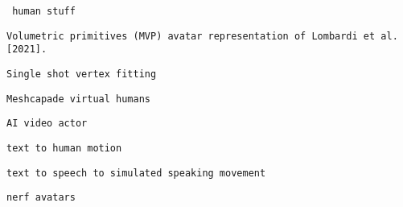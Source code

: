        
       
        \protect\hypertarget{ID_540648079}{}{}

\begin{verbatim}
 human stuff
\end{verbatim}

         
         
          \protect\hypertarget{ID_917082420}{}{}

\begin{verbatim}
Volumetric primitives (MVP) avatar representation of Lombardi et al. [2021].
\end{verbatim}
         

         
         
          \protect\hypertarget{ID_208977071}{}{}

\begin{verbatim}
Single shot vertex fitting
\end{verbatim}
         

         
         
          \protect\hypertarget{ID_1227330492}{}{}

\begin{verbatim}
Meshcapade virtual humans
\end{verbatim}
         

         
         
          \protect\hypertarget{ID_149878234}{}{}

\begin{verbatim}
AI video actor
\end{verbatim}
         

         
         
          \protect\hypertarget{ID_774594158}{}{}

\begin{verbatim}
text to human motion
\end{verbatim}
         

         
         
          \protect\hypertarget{ID_324255258}{}{}

\begin{verbatim}
text to speech to simulated speaking movement
\end{verbatim}
         

         
         
          \protect\hypertarget{ID_927092701}{}{}

\begin{verbatim}
nerf avatars
\end{verbatim}
         

